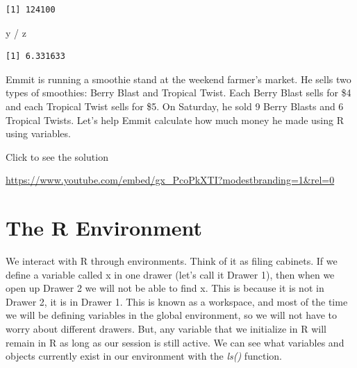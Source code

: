 \documentclass[
  letterpaper,
  DIV=11,
  numbers=noendperiod]{scrreprt}
\newenvironment{Shaded}{\begin{snugshade}}{\end{snugshade}}
\newcommand{\NormalTok}[1]{\textcolor[rgb]{0.00,0.23,0.31}{#1}}
\newcommand{\SpecialCharTok}[1]{\textcolor[rgb]{0.37,0.37,0.37}{#1}}
\begin{document}
\begin{verbatim}
[1] 124100
\end{verbatim}

\begin{Shaded}
\begin{Highlighting}[]
\NormalTok{y }\SpecialCharTok{/}\NormalTok{ z}
\end{Highlighting}
\end{Shaded}

\begin{verbatim}
[1] 6.331633
\end{verbatim}

\begin{tcolorbox}[enhanced jigsaw, leftrule=.75mm, arc=.35mm, coltitle=black, rightrule=.15mm, bottomrule=.15mm, toprule=.15mm, left=2mm, colbacktitle=quarto-callout-tip-color!10!white, title=\textcolor{quarto-callout-tip-color}{\faLightbulb}\hspace{0.5em}{Try it Out}, toptitle=1mm, breakable, colframe=quarto-callout-tip-color-frame, bottomtitle=1mm, titlerule=0mm, colback=white, opacityback=0, opacitybacktitle=0.6]

Emmit is running a smoothie stand at the weekend farmer's market. He
sells two types of smoothies: Berry Blast and Tropical Twist. Each Berry
Blast sells for \$4 and each Tropical Twist sells for \$5. On Saturday,
he sold 9 Berry Blasts and 6 Tropical Twists. Let's help Emmit calculate
how much money he made using R using variables.

Click to see the solution

\url{https://www.youtube.com/embed/gx_PcoPkXTI?modestbranding=1&rel=0}

\end{tcolorbox}

\section{The R Environment}\label{the-r-environment}

We interact with R through environments. Think of it as filing cabinets.
If we define a variable called x in one drawer (let's call it Drawer 1),
then when we open up Drawer 2 we will not be able to find x. This is
because it is not in Drawer 2, it is in Drawer 1. This is known as a
workspace, and most of the time we will be defining variables in the
global environment, so we will not have to worry about different
drawers. But, any variable that we initialize in R will remain in R as
long as our session is still active. We can see what variables and
objects currently exist in our environment with the \emph{ls()}
function.
\end{document}
